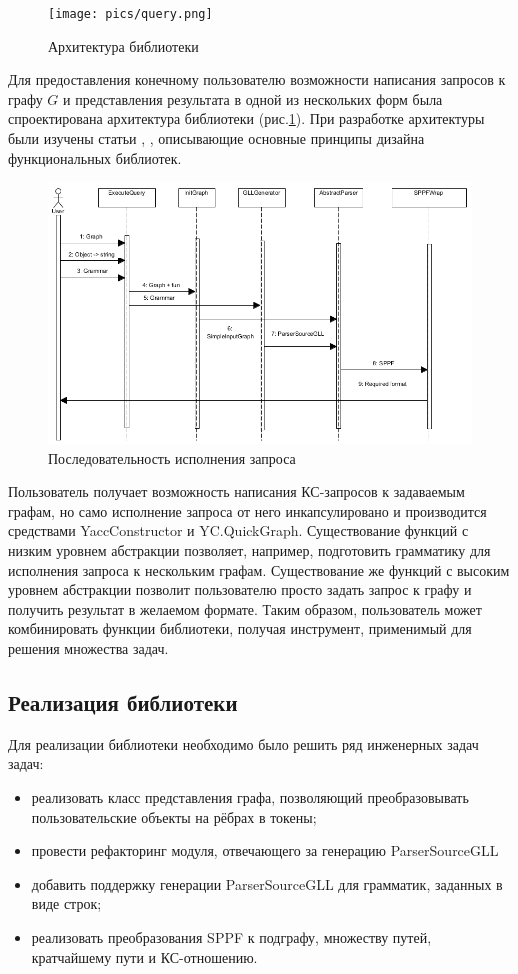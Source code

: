 \documentclass[14pt]{matmex-diploma-custom}
\begin{document}
    \begin{figure}
        \centering
        \texttt{[image: pics/query.png]}
        \caption{Архитектура библиотеки \label{arch_lib}}
    \end{figure}
    Для предоставления конечному пользователю возможности написания запросов к графу \(G\) и представления результата в одной из нескольких форм была спроектирована архитектура библиотеки (рис.\ref{arch_lib}). При разработке архитектуры были изучены статьи \cite{funcdes1}, \cite{funcdes2}, описывающие основные принципы дизайна функциональных библиотек.
    \begin{figure}
        \centering
        \includegraphics[width=\textwidth]{pics/pipeline.png}
        \caption{Последовательность исполнения запроса \label{pipeline}}
    \end{figure}
    Пользователь получает возможность написания КС-запросов к задаваемым графам, но само исполнение запроса от него инкапсулировано и производится средствами YaccConstructor и YC.QuickGraph. Существование функций с низким уровнем абстракции позволяет, например, подготовить грамматику для исполнения запроса к нескольким графам. Существование же функций с высоким уровнем абстракции позволит пользователю просто задать запрос к графу и получить результат в желаемом формате. Таким образом, пользователь может комбинировать функции библиотеки, получая инструмент, применимый для решения множества задач.
    
    \subsection{Реализация библиотеки}
    Для реализации библиотеки необходимо было решить ряд инженерных задач задач:
    \begin{itemize}
        \item реализовать класс представления графа, позволяющий преобразовывать пользовательские объекты на рёбрах в токены;
        \item провести рефакторинг модуля, отвечающего за генерацию ParserSourceGLL
        \item добавить поддержку генерации ParserSourceGLL для грамматик, заданных в виде строк;
        \item реализовать преобразования SPPF к подграфу, множеству путей, кратчайшему пути и КС-отношению.
    \end{itemize}
    
\end{document}
